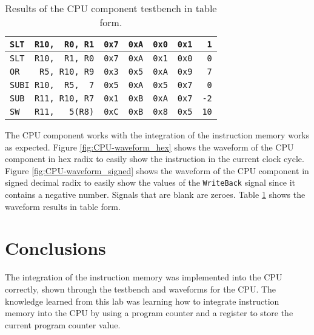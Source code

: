 \documentclass[11pt]{report}
\begin{document}
\begin{table}[ht!]
\begin{tabular}{|l||c|c|c|c|c|}
     \verb|SLT  R10,  R0, R1| & \verb|0x7| & \verb|0xA| & \verb|0x0| & \verb|0x1| & \verb| 1| \\
     \hline                                                                                
     \verb|SLT  R10,  R1, R0| & \verb|0x7| & \verb|0xA| & \verb|0x1| & \verb|0x0| & \verb| 0| \\
     \hline                                                                                
     \verb|OR    R5, R10, R9| & \verb|0x3| & \verb|0x5| & \verb|0xA| & \verb|0x9| & \verb| 7| \\
     \hline                                                                                
     \verb|SUBI R10,  R5,  7| & \verb|0x5| & \verb|0xA| & \verb|0x5| & \verb|0x7| & \verb| 0| \\
     \hline                                                                              
     \verb|SUB  R11, R10, R7| & \verb|0x1| & \verb|0xB| & \verb|0xA| & \verb|0x7| & \verb|-2| \\
     \hline                                                                             
     \verb|SW   R11,   5(R8)| & \verb|0xC| & \verb|0xB| & \verb|0x8| & \verb|0x5| & \verb|10| \\
     \hline                                                                             
    \end{tabular}
    \caption{Results of the CPU component testbench in table form.}
    \label{table:CPU-waveform_table}
\end{table}

The CPU component works with the integration of the instruction memory works as expected. Figure
\ref{fig:CPU-waveform_hex} shows the waveform of the CPU component in hex radix to easily show the
instruction in the current clock cycle. Figure \ref{fig:CPU-waveform_signed} shows the waveform of
the CPU component in signed decimal radix to easily show the values of the \verb|WriteBack| signal
since it contains a negative number. Signals that are blank are zeroes. Table
\ref{table:CPU-waveform_table} shows the waveform results in table form.

\newpage

\section*{Conclusions}
The integration of the instruction memory was implemented into the CPU correctly, shown through the
testbench and waveforms for the CPU. The knowledge learned from this lab was learning how to
integrate instruction memory into the CPU by using a program counter and a register to store the
current program counter value.
\end{document}
